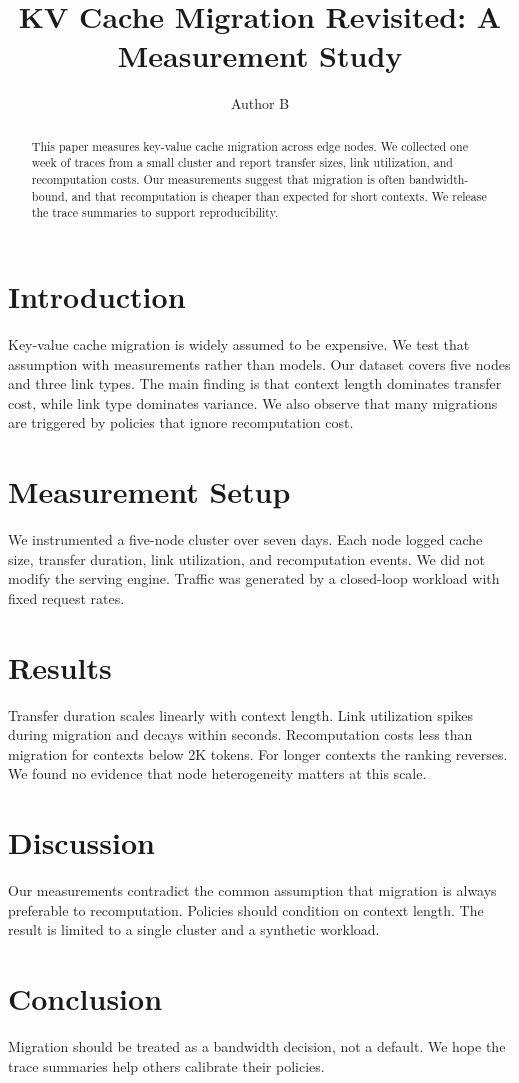 \documentclass[conference]{IEEEtran}
\title{KV Cache Migration Revisited: A Measurement Study}
\author{Author B}
\begin{document}
\maketitle

\begin{abstract}
This paper measures key-value cache migration across edge nodes. We collected one week of traces from a small cluster and report transfer sizes, link utilization, and recomputation costs. Our measurements suggest that migration is often bandwidth-bound, and that recomputation is cheaper than expected for short contexts. We release the trace summaries to support reproducibility.
\end{abstract}

\section{Introduction}
Key-value cache migration is widely assumed to be expensive. We test that assumption with measurements rather than models. Our dataset covers five nodes and three link types. The main finding is that context length dominates transfer cost, while link type dominates variance. We also observe that many migrations are triggered by policies that ignore recomputation cost.

\section{Measurement Setup}
We instrumented a five-node cluster over seven days. Each node logged cache size, transfer duration, link utilization, and recomputation events. We did not modify the serving engine. Traffic was generated by a closed-loop workload with fixed request rates.

\section{Results}
Transfer duration scales linearly with context length. Link utilization spikes during migration and decays within seconds. Recomputation costs less than migration for contexts below 2K tokens. For longer contexts the ranking reverses. We found no evidence that node heterogeneity matters at this scale.

\section{Discussion}
Our measurements contradict the common assumption that migration is always preferable to recomputation. Policies should condition on context length. The result is limited to a single cluster and a synthetic workload.

\section{Conclusion}
Migration should be treated as a bandwidth decision, not a default. We hope the trace summaries help others calibrate their policies.
\end{document}
